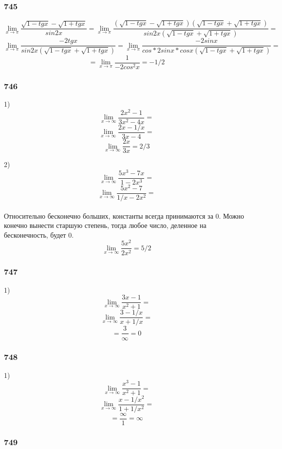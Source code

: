 \documentclass[12pt]{article}
\begin{document}
\newpage
\subsubsection{745}

$$
\lim_{x\to \pi} \frac{\sqrt{1-tgx}-\sqrt{1+tgx}}{sin2x}=
\lim_{x\to \pi} \frac{(\sqrt{1-tgx}-\sqrt{1+tgx})(\sqrt{1-tgx}+\sqrt{1+tgx})}{sin2x(\sqrt{1-tgx}+\sqrt{1+tgx})}=
$$
$$
\lim_{x\to \pi} \frac{-2tgx}{sin2x(\sqrt{1-tgx}+\sqrt{1+tgx})}=
\lim_{x\to \pi} \frac{-2sinx}{cos*2sinx*cosx(\sqrt{1-tgx}+\sqrt{1+tgx})}=
$$
$$
=\lim_{x\to \pi} \frac{1}{-2cos^2 x}=-1/2
$$

\newpage
\subsubsection{746}

1)\\
$$
\lim_{x\to \infty} \frac{2x^2-1}{3x^2-4x}=
$$
$$
\lim_{x\to \infty} \frac{2x-1/x}{3x-4}=
$$
$$
\lim_{x\to \infty} \frac{2x}{3x}=2/3
$$

2)\\
$$
\lim_{x\to \infty} \frac{5x^3-7x}{1-2x^3}=
$$
$$
\lim_{x\to \infty} \frac{5x^2-7}{1/x-2x^2}=
$$\\
Относительно бесконечно больших, константы всегда принимаются за 0. Можно конечно вынести старшую степень,  тогда любое число, деленное на бесконечность, будет 0.
$$
\lim_{x\to \infty} \frac{5x^2}{2x^2}=5/2
$$

\newpage
\subsubsection{747}

1)\\
$$
\lim_{x\to \infty} \frac{3x-1}{x^2+1}=
$$
$$
\lim_{x\to \infty} \frac{3-1/x}{x+1/x}=
$$
$$
=\frac{3}{\infty} = 0
$$

\newpage
\subsubsection{748}

1)\\
$$
\lim_{x\to \infty} \frac{x^3-1}{x^2+1}=
$$
$$
\lim_{x\to \infty} \frac{x-1/x^2}{1+1/x^2}=
$$
$$
=\frac{\infty}{1} = \infty
$$

\newpage
\subsubsection{749}
\end{document}
